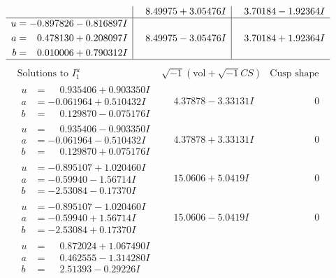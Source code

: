 \documentclass[1p]{elsarticle_modified}
\theoremstyle{definition}
\newcommand{\I}{\sqrt{-1}}
\begin{document}
$$\begin{array}{c|c|c}
 & \phantom{-}8.49975 + 3.05476 I & \phantom{-}3.70184 - 1.92364 I \\ \hline\begin{aligned}
u &= -0.897826 - 0.816897 I \\
a &= \phantom{-}0.478130 + 0.208097 I \\
b &= \phantom{-}0.010006 + 0.790312 I\end{aligned}
 & \phantom{-}8.49975 - 3.05476 I & \phantom{-}3.70184 + 1.92364 I\\
 \hline 
 \end{array}$$\newpage$$\begin{array}{c|c|c}  
\text{Solutions to }I^u_{1}& \I (\text{vol} + \sqrt{-1}CS) & \text{Cusp shape}\\
 \hline 
\begin{aligned}
u &= \phantom{-}0.935406 + 0.903350 I \\
a &= -0.061964 + 0.510432 I \\
b &= \phantom{-}0.129870 - 0.075176 I\end{aligned}
 & \phantom{-}4.37878 - 3.33131 I & \phantom{-0.000000 } 0 \\ \hline\begin{aligned}
u &= \phantom{-}0.935406 - 0.903350 I \\
a &= -0.061964 - 0.510432 I \\
b &= \phantom{-}0.129870 + 0.075176 I\end{aligned}
 & \phantom{-}4.37878 + 3.33131 I & \phantom{-0.000000 } 0 \\ \hline\begin{aligned}
u &= -0.895107 + 1.020460 I \\
a &= -0.59940 - 1.56714 I \\
b &= -2.53084 - 0.17370 I\end{aligned}
 & \phantom{-}15.0606 + 5.0419 I & \phantom{-0.000000 } 0 \\ \hline\begin{aligned}
u &= -0.895107 - 1.020460 I \\
a &= -0.59940 + 1.56714 I \\
b &= -2.53084 + 0.17370 I\end{aligned}
 & \phantom{-}15.0606 - 5.0419 I & \phantom{-0.000000 } 0 \\ \hline\begin{aligned}
u &= \phantom{-}0.872024 + 1.067490 I \\
a &= \phantom{-}0.462555 - 1.314280 I \\
b &= \phantom{-}2.51393 - 0.29226 I\end{aligned}

\end{array}$$
\end{document}
